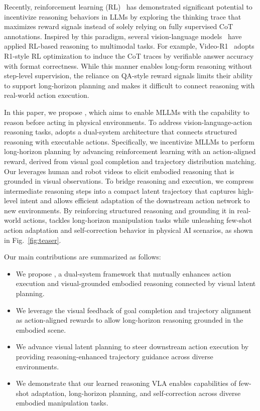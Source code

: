 Recently, reinforcement learning (RL)~\cite{shao2024deepseekmath,guo2025deepseek} has demonstrated significant potential to incentivize reasoning behaviors in LLMs by exploring the thinking trace that maximizes reward signals instead of solely relying on fully supervised CoT annotations. Inspired by this paradigm, several vision-language models~\cite{feng2025video,nvidia2025cosmosreason1physicalcommonsense,tan2025reason} have applied RL-based reasoning to multimodal tasks. For example, Video-R1~\cite{feng2025video} adopts R1-style RL optimization to induce the CoT traces by verifiable answer accuracy with format correctness. While this manner enables long-form reasoning without step-level supervision, the reliance on QA-style reward signals limits their ability to support long-horizon planning and makes it difficult to connect reasoning with real-world action execution. 


In this paper, we propose \textit{\ours{}}, which aims to enable MLLMs with the capability to reason before acting in physical environments. To address vision-language-action reasoning tasks, \ours{} adopts a dual-system architecture that connects structured reasoning with executable actions. Specifically, we incentivize MLLMs to perform long-horizon planning by advancing reinforcement learning with an action-aligned reward, derived from visual goal completion and trajectory distribution matching. Our \ours{} leverages human and robot videos to elicit embodied reasoning that is grounded in visual observations. To bridge reasoning and execution, we compress intermediate reasoning steps into a compact latent trajectory that captures high-level intent and allows efficient adaptation of the downstream action network to new environments. By reinforcing structured reasoning and grounding it in real-world actions, \ours{} tackles long-horizon manipulation tasks while unleashing few-shot action adaptation and self-correction behavior in physical AI scenarios, as shown in Fig.~\ref{fig:teaser}.




Our main contributions are summarized as follows:
\begin{itemize}
    \item We propose \textit{\ours{}}, a dual-system framework that mutually enhances action execution and visual-grounded embodied reasoning connected by visual latent planning.

    \item We leverage the visual feedback of goal completion and trajectory alignment as action-aligned rewards to allow long-horizon reasoning grounded in the embodied scene.
    
    \item We advance visual latent planning to steer downstream action execution by providing reasoning-enhanced trajectory guidance across diverse environments.
    
    \item We demonstrate that our learned reasoning VLA enables capabilities of few-shot adaptation, long-horizon planning, and self-correction across diverse embodied manipulation tasks.
\end{itemize}